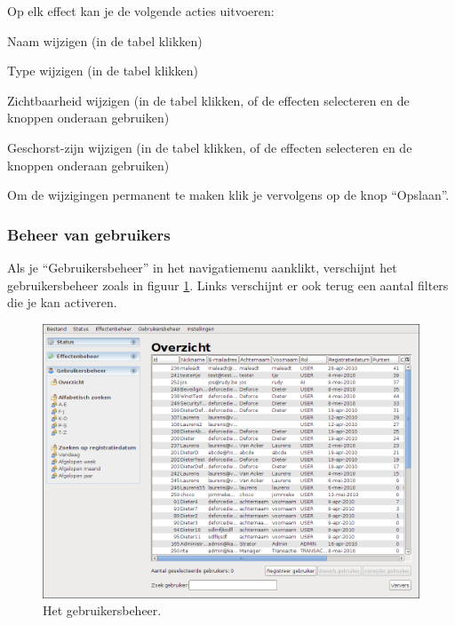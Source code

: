 Op elk effect kan je de volgende acties uitvoeren:

\begin{itemize_compact}
\item{Naam wijzigen (in de tabel klikken)}
\item{Type wijzigen (in de tabel klikken)}
\item{Zichtbaarheid wijzigen (in de tabel klikken, of de effecten selecteren en de knoppen onderaan gebruiken)}
\item{Geschorst-zijn wijzigen (in de tabel klikken, of de effecten selecteren en de knoppen onderaan gebruiken)}
\end{itemize_compact}

Om de wijzigingen permanent te maken klik je vervolgens op de knop ``Opslaan''.

\subsubsection{Beheer van gebruikers}
\label{sec:handl:admin:gebruikers}

Als je ``Gebruikersbeheer'' in het navigatiemenu aanklikt, verschijnt het gebruikersbeheer zoals in figuur \ref{fig:handl:admin:gebruikers-overzicht}.
Links verschijnt er ook terug een aantal filters die je kan activeren.

\begin{figure}[h!]
	\centering
		\includegraphics[width=\textwidth]{images/handleiding/administratie/gebruikers-overzicht}
	\caption{Het gebruikersbeheer.}
		\label{fig:handl:admin:gebruikers-overzicht}
\end{figure}

